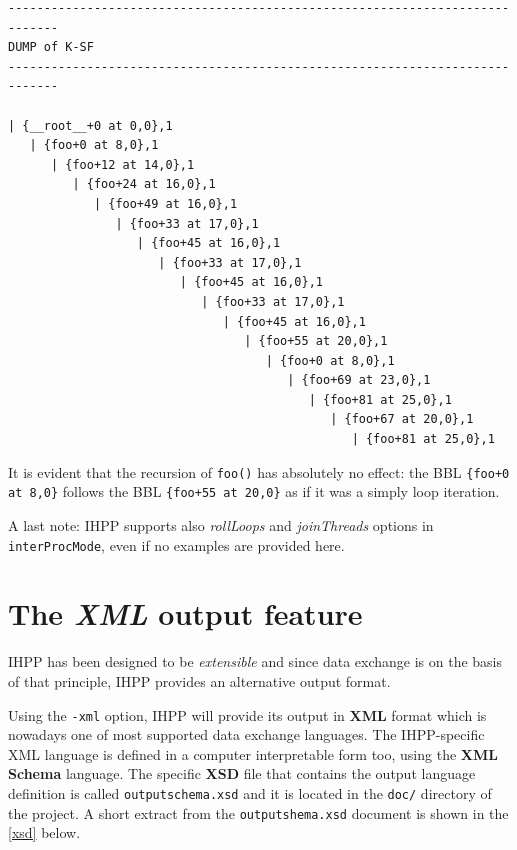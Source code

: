 \documentclass[a4paper,10pt]{report}
\begin{document}
\begin{lstlisting}[label=out14, 
caption={partial output of IHPP analysis in \texttt{interProcMode} of \texttt{prog4}}]
-----------------------------------------------------------------------------
DUMP of K-SF
-----------------------------------------------------------------------------

| {__root__+0 at 0,0},1
   | {foo+0 at 8,0},1
      | {foo+12 at 14,0},1
         | {foo+24 at 16,0},1
            | {foo+49 at 16,0},1
               | {foo+33 at 17,0},1
                  | {foo+45 at 16,0},1
                     | {foo+33 at 17,0},1
                        | {foo+45 at 16,0},1
                           | {foo+33 at 17,0},1
                              | {foo+45 at 16,0},1
                                 | {foo+55 at 20,0},1
                                    | {foo+0 at 8,0},1
                                       | {foo+69 at 23,0},1
                                          | {foo+81 at 25,0},1
                                             | {foo+67 at 20,0},1
                                                | {foo+81 at 25,0},1

\end{lstlisting}

\noindent
It is evident that the recursion of \verb|foo()| has absolutely no effect:
the BBL \verb|{foo+0 at 8,0}| follows the BBL \verb|{foo+55 at 20,0}| as if 
it was a simply loop iteration.

A last note: IHPP supports also \emph{rollLoops} and \emph{joinThreads} options
in \verb|interProcMode|, even if no examples are provided here.

\section{The \emph{XML} output feature}

IHPP has been designed to be \emph{extensible} and since data exchange is on the basis
of that principle, IHPP provides an alternative output format.

Using the \verb|-xml| option, IHPP will provide its output in \textbf{XML} format
which is nowadays one of most supported data exchange languages.
The IHPP-specific XML language is defined in a computer interpretable form too, 
using the \textbf{XML Schema} language. 
The specific \textbf{XSD} file that contains the output language definition 
is called \verb|outputschema.xsd| and it is located in the \verb|doc/| directory
of the project. A short extract from the \verb|outputshema.xsd| document is 
shown in the \cref{xsd} below.
\end{document}
